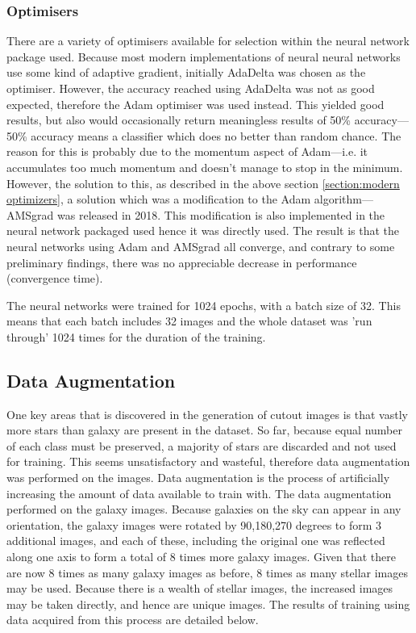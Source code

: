 \documentclass[a4paper,fleqn,usenatbib]{mnras}
\begin{document}
\subsubsection{Optimisers}
There are a variety of optimisers available for selection within the neural network package used. Because most modern implementations of neural neural networks use some kind of adaptive gradient, initially AdaDelta was chosen as the optimiser. However, the accuracy reached using AdaDelta was not as good expected, therefore the Adam optimiser was used instead. This yielded good results, but also would occasionally return meaningless results of 50\% accuracy---50\% accuracy means a classifier which does no better than random chance. The reason for this is probably due to the momentum aspect of Adam---i.e. it accumulates too much momentum and doesn't manage to stop in the minimum. However, the solution to this, as described in the above section \ref{section:modern optimizers}, a solution which was a modification to the Adam algorithm---AMSgrad was released in 2018. This modification is also implemented in the neural network packaged used hence it was directly used. The result is that the neural networks using Adam and AMSgrad all converge, and contrary to some preliminary findings, there was no appreciable decrease in performance (convergence time). 

The neural networks were trained for 1024 epochs, with a batch size of 32. This means that each batch includes 32 images and the whole dataset was 'run through' 1024 times for the duration of the training. 

\subsection{Data Augmentation}
One key areas that is discovered in the generation of cutout images is that vastly more stars than galaxy are present in the dataset. So far, because equal number of each class must be preserved, a majority of stars are discarded and not used for training. This seems unsatisfactory and wasteful, therefore data augmentation was performed on the images. Data augmentation is the process of artificially increasing the amount of data available to train with. The data augmentation performed on the galaxy images. Because galaxies on the sky can appear in any orientation, the galaxy images were rotated by 90,180,270 degrees to form 3 additional images, and each of these, including the original one was reflected along one axis to form a total of 8 times more galaxy images. Given that there are now 8 times as many galaxy images as before, 8 times as many stellar images may be used. Because there is a wealth of stellar images, the increased images may be taken directly, and hence are unique images. The results of training using data acquired from this process are detailed below.
\end{document}

